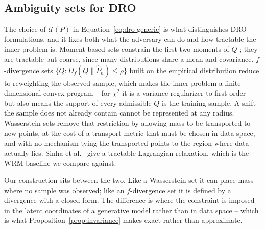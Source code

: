 \documentclass[11pt]{article}
\newcommand{\amb}{\mathcal{U}}
\newcommand{\Div}{D_f}
\begin{document}
\subsection{Ambiguity sets for DRO}
The choice of $\amb(P)$ in Equation~\ref{eq:dro-generic} is what distinguishes DRO
formulations, and it fixes both what the adversary can do and how tractable the inner
problem is. Moment-based sets constrain the first two moments of $Q$
\citep{delage2010}; they are tractable but coarse, since many distributions share a mean
and covariance. $f$-divergence sets $\{Q : \Div(Q\|\hat P_n) \le \rho\}$ built on the
empirical distribution \citep{ben-tal2009,namkoong2016,duchi2021} reduce to reweighting the
observed sample, which makes the inner problem a finite-dimensional convex program -- for
$\chi^2$ it is a variance regularizer to first order -- but also means the support of every
admissible $Q$ is the training sample. A shift the sample does not already contain cannot
be represented at any radius. Wasserstein sets
\citep{esfahani2018,kuhn2019,sinha2018} remove that restriction by allowing mass to be
transported to new points, at the cost of a transport metric that must be chosen in data
space, and with no mechanism tying the transported points to the region where data actually
lies. Sinha et al.\ \citep{sinha2018} give a tractable Lagrangian relaxation, which is the WRM baseline we
compare against.

Our construction sits between the two. Like a Wasserstein set it can place mass where no
sample was observed; like an $f$-divergence set it is defined by a divergence with a closed
form. The difference is where the constraint is imposed -- in the latent coordinates of a
generative model rather than in data space -- which is what
Proposition~\ref{prop:invariance} makes exact rather than approximate.
\end{document}
